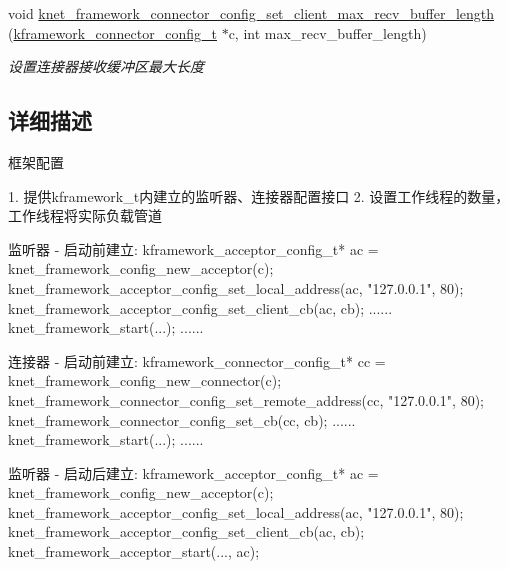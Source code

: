 \begin{DoxyCompactItemize}
void \hyperlink{a00104_ga671b44cb682198b418b21749e6b2fdbe_ga671b44cb682198b418b21749e6b2fdbe}{knet\+\_\+framework\+\_\+connector\+\_\+config\+\_\+set\+\_\+client\+\_\+max\+\_\+recv\+\_\+buffer\+\_\+length} (\hyperlink{a00051_a44d3033eba5a4fd784a741700a7a2521_a44d3033eba5a4fd784a741700a7a2521}{kframework\+\_\+connector\+\_\+config\+\_\+t} $\ast$c, int max\+\_\+recv\+\_\+buffer\+\_\+length)
\begin{DoxyCompactList}\small\item\em 设置连接器接收缓冲区最大长度 \end{DoxyCompactList}\end{DoxyCompactItemize}


\subsection{详细描述}
框架配置 


\begin{DoxyPre}
1. 提供kframework\_t内建立的监听器、连接器配置接口
2. 设置工作线程的数量，工作线程将实际负载管道\end{DoxyPre}



\begin{DoxyPre}监听器 - 启动前建立:
    kframework\_acceptor\_config\_t* ac = knet\_framework\_config\_new\_acceptor(c);
    knet\_framework\_acceptor\_config\_set\_local\_address(ac, "127.0.0.1", 80);
    knet\_framework\_acceptor\_config\_set\_client\_cb(ac, cb);
    ......
    knet\_framework\_start(...);
    ......\end{DoxyPre}



\begin{DoxyPre}连接器 - 启动前建立:
    kframework\_connector\_config\_t* cc = knet\_framework\_config\_new\_connector(c);
    knet\_framework\_connector\_config\_set\_remote\_address(cc, "127.0.0.1", 80);
    knet\_framework\_connector\_config\_set\_cb(cc, cb);
    ......
    knet\_framework\_start(...);
    ......\end{DoxyPre}



\begin{DoxyPre}监听器 - 启动后建立:
    kframework\_acceptor\_config\_t* ac = knet\_framework\_config\_new\_acceptor(c);
    knet\_framework\_acceptor\_config\_set\_local\_address(ac, "127.0.0.1", 80);
    knet\_framework\_acceptor\_config\_set\_client\_cb(ac, cb);
    knet\_framework\_acceptor\_start(..., ac);\end{DoxyPre}



